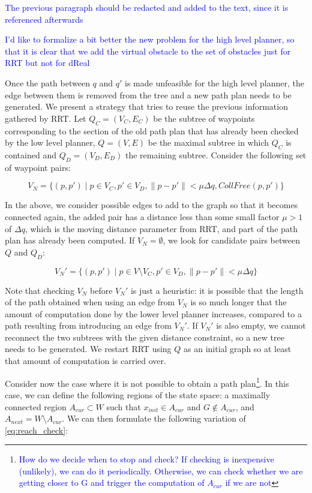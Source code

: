\documentclass[12pt]{article}
\newcommand\fran[1]{\textcolor{blue}{#1}}
\newcommand\ffran[1]{\textcolor{blue}{\footnote{\fran{#1}}}}
\begin{document}
\fran{The previous paragraph should be redacted and added to the text, since it is referenced afterwards}

\fran{I'd like to formalize a bit better the new problem for the high level planner, so that it is clear that we add the virtual obstacle to the set of obstacles just for RRT but not for dReal}

Once the path between $q$ and $q'$ is made unfeasible for the high level planner, the edge between them is removed from the tree and a new path plan needs to be generated. We present a strategy that tries to reuse the previous information gathered by RRT. Let $Q_C = (V_C, E_C)$ be the subtree of waypoints corresponding to the section of the old path plan that has already been checked by the low level planner, $Q = (V, E)$ be the maximal subtree in which $Q_C$ is contained and $Q_D = (V_D, E_D)$ the remaining subtree. Consider the following set of waypoint pairs:

\begin{equation}
    \label{eq:checked_candidates}
    V_N = \{(p, p') \mid p \in V_C, p' \in V_D, \|p - p'\| < \mu \Delta q, CollFree(p, p')\}
\end{equation}

In the above, we consider possible edges to add to the graph so that it becomes connected again, the added pair has a distance less than some small factor $\mu > 1$ of $\Delta q$, which is the moving distance parameter from RRT, and part of the path plan has already been computed. If $V_N = \emptyset$, we look for candidate pairs between $Q$ and $Q_D$:

\begin{equation}
    \label{eq:unchecked_candidates}
    V_N' = \{(p, p') \mid p \in V \setminus V_C, p' \in V_D, \|p - p'\| < \mu \Delta q\}
\end{equation}

Note that checking $V_N$ before $V_N'$ is just a heuristic: it is possible that the length of the path obtained when using an edge from $V_N$ is so much longer that the amount of computation done by the lower level planner increases, compared to a path resulting from introducing an edge from $V_N'$. If $V_N'$ is also empty, we cannot reconnect the two subtrees with the given distance constraint, so a new tree needs to be generated. We restart RRT using $Q$ as an initial graph so at least that amount of computation is carried over.

Consider now the case where it is not possible to obtain a path plan\ffran{How do we decide when to stop and check? If checking is inexpensive (unlikely), we can do it periodically. Otherwise, we can check whether we are getting closer to G and trigger the computation of $A_{cur}$ if we are not}. In this case, we can define the following regions of the state space: a maximally connected region $A_{cur} \subset W$ such that $x_{init} \in A_{cur}$ and $G \notin A_{cur}$, and $A_{next} = W \setminus A_{cur}$. We can then formulate the following variation of \eqref{eq:reach_check}:
\end{document}

